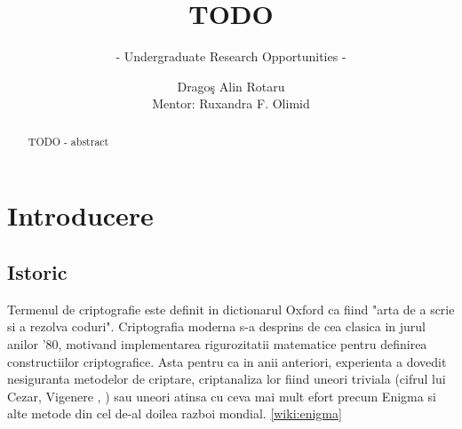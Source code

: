 \documentclass{llncs}
\begin{document}
\pagestyle{empty}
%
%
\title{TODO}
%
%
\subtitle{- Undergraduate Research Opportunities - }
\author{Drago\c{s} Alin Rotaru\\{\small Mentor: Ruxandra F. Olimid}}
%



\maketitle              %

\begin{abstract}
TODO - abstract
\end{abstract}

\tableofcontents
\newpage

\section{Introducere}
\label{sec:intro}

\subsection{Istoric}
Termenul de criptografie este definit in dictionarul Oxford ca fiind "arta de a scrie si a rezolva coduri".
Criptografia moderna s-a desprins de cea clasica in jurul anilor '80, motivand implementarea rigurozitatii matematice pentru definirea constructiilor criptografice. Asta pentru ca in anii anteriori, experienta a dovedit nesiguranta metodelor de criptare, criptanaliza lor fiind uneori triviala (cifrul lui Cezar, Vigenere \cite{Caesar:2015}, \cite{Vigenere:2015}) sau uneori atinsa cu ceva mai mult efort precum Enigma si alte metode din cel de-al doilea razboi mondial. \ref{wiki:enigma}
\end{document}
